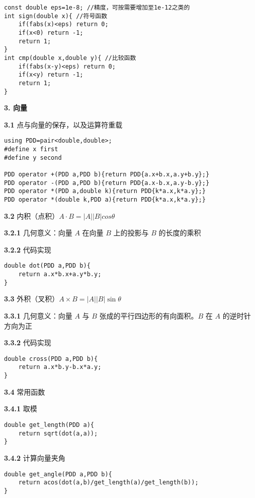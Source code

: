 \documentclass[12pt]{article}
\begin{document}
\begin{lstlisting}[style=C++]
const double eps=1e-8; //精度，可按需要增加至1e-12之类的
int sign(double x){ //符号函数
	if(fabs(x)<eps) return 0;
	if(x<0) return -1;
	return 1;
}
int cmp(double x,double y){ //比较函数
	if(fabs(x-y)<eps) return 0;
	if(x<y) return -1;
	return 1;
}
\end{lstlisting}


\textbf{3. 向量}

\textbf{3.1} 点与向量的保存，以及运算符重载

\begin{lstlisting}[style=C++]
using PDD=pair<double,double>;
#define x first
#define y second

PDD operator +(PDD a,PDD b){return PDD{a.x+b.x,a.y+b.y};}
PDD operator -(PDD a,PDD b){return PDD{a.x-b.x,a.y-b.y};}
PDD operator *(PDD a,double k){return PDD{k*a.x,k*a.y};}
PDD operator *(double k,PDD a){return PDD{k*a.x,k*a.y};}
\end{lstlisting}

\textbf{3.2} 内积（点积）$A\cdot B = |A||B|cos\theta$

\textbf{3.2.1} 几何意义：向量 $A$ 在向量 $B$ 上的投影与 $B$ 的长度的乘积
		
\textbf{3.2.2} 代码实现

\begin{lstlisting}[style=C++]
double dot(PDD a,PDD b){
	return a.x*b.x+a.y*b.y;
}
\end{lstlisting}

\textbf{3.3} 外积（叉积）$A\times B=|A||B|\sin\theta$

\textbf{3.3.1} 几何意义：向量 $A$ 与 $B$ 张成的平行四边形的有向面积。$B$ 在 $A$ 的逆时针方向为正
		
\textbf{3.3.2} 代码实现

\begin{lstlisting}[style=C++]
double cross(PDD a,PDD b){
	return a.x*b.y-b.x*a.y;
}
\end{lstlisting}

\textbf{3.4} 常用函数

\textbf{3.4.1} 取模

\begin{lstlisting}[style=C++]
double get_length(PDD a){
	return sqrt(dot(a,a));
}
\end{lstlisting}

\textbf{3.4.2} 计算向量夹角

\begin{lstlisting}[style=C++]
double get_angle(PDD a,PDD b){
	return acos(dot(a,b)/get_length(a)/get_length(b));
}
\end{lstlisting}
\end{document}
